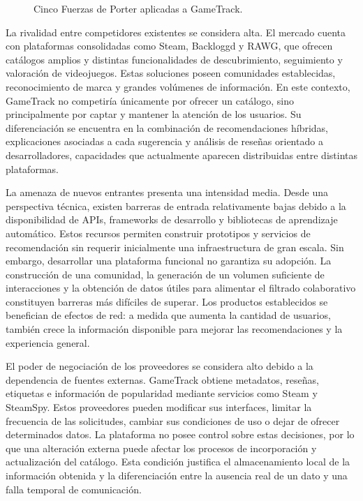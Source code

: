 \begin{figure}[H]
	\centering
	\caption{Cinco Fuerzas de Porter aplicadas a GameTrack.}
	\label{fig:porter}
\end{figure}

La rivalidad entre competidores existentes se considera alta. El mercado cuenta con plataformas consolidadas como Steam, Backloggd y RAWG, que ofrecen catálogos amplios y distintas funcionalidades de descubrimiento, seguimiento y valoración de videojuegos. Estas soluciones poseen comunidades establecidas, reconocimiento de marca y grandes volúmenes de información. En este contexto, GameTrack no competiría únicamente por ofrecer un catálogo, sino principalmente por captar y mantener la atención de los usuarios. Su diferenciación se encuentra en la combinación de recomendaciones híbridas, explicaciones asociadas a cada sugerencia y análisis de reseñas orientado a desarrolladores, capacidades que actualmente aparecen distribuidas entre distintas plataformas.

La amenaza de nuevos entrantes presenta una intensidad media. Desde una perspectiva técnica, existen barreras de entrada relativamente bajas debido a la disponibilidad de APIs, frameworks de desarrollo y bibliotecas de aprendizaje automático. Estos recursos permiten construir prototipos y servicios de recomendación sin requerir inicialmente una infraestructura de gran escala. Sin embargo, desarrollar una plataforma funcional no garantiza su adopción. La construcción de una comunidad, la generación de un volumen suficiente de interacciones y la obtención de datos útiles para alimentar el filtrado colaborativo constituyen barreras más difíciles de superar. Los productos establecidos se benefician de efectos de red: a medida que aumenta la cantidad de usuarios, también crece la información disponible para mejorar las recomendaciones y la experiencia general.

El poder de negociación de los proveedores se considera alto debido a la dependencia de fuentes externas. GameTrack obtiene metadatos, reseñas, etiquetas e información de popularidad mediante servicios como Steam y SteamSpy. Estos proveedores pueden modificar sus interfaces, limitar la frecuencia de las solicitudes, cambiar sus condiciones de uso o dejar de ofrecer determinados datos. La plataforma no posee control sobre estas decisiones, por lo que una alteración externa puede afectar los procesos de incorporación y actualización del catálogo. Esta condición justifica el almacenamiento local de la información obtenida y la diferenciación entre la ausencia real de un dato y una falla temporal de comunicación.

